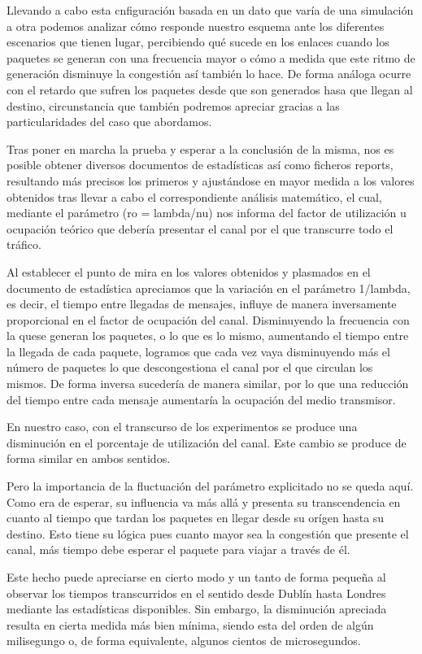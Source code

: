 Llevando a cabo esta cnfiguración basada en un dato que varía de una simulación a otra podemos analizar cómo responde nuestro esquema ante los diferentes escenarios que tienen lugar, percibiendo qué sucede en los enlaces cuando los paquetes se generan con una frecuencia mayor o cómo a medida que este ritmo de generación disminuye la congestión así también lo hace. De forma análoga ocurre con el retardo que sufren los paquetes desde que son generados hasa que llegan al destino, circunstancia que también podremos apreciar gracias a las particularidades del caso que abordamos.

Tras poner en marcha la prueba y esperar a la conclusión de la misma, nos es posible obtener diversos documentos de estadísticas así como ficheros reports, resultando más precisos los primeros y ajustándose en mayor medida a los valores obtenidos tras llevar a cabo el correspondiente análisis matemático, el cual, mediante el parámetro (ro = lambda/nu) nos informa del factor de utilización u ocupación teórico que debería presentar el canal por el que transcurre todo el tráfico.

Al establecer el punto de mira en los valores obtenidos y plasmados en el documento de estadística apreciamos que la variación en el parámetro 1/lambda, es decir, el tiempo entre llegadas de mensajes, influye de manera inversamente proporcional en el factor de ocupación del canal. Disminuyendo la frecuencia con la quese generan los paquetes, o lo que es lo mismo, aumentando el tiempo entre la llegada de cada paquete, logramos que cada vez vaya disminuyendo más el número de paquetes lo que descongestiona el canal por el que circulan los mismos. De forma inversa sucedería de manera similar, por lo que una reducción del tiempo entre cada mensaje aumentaría la ocupación del medio transmisor.

En nuestro caso, con el transcurso de los experimentos se produce una disminución en el porcentaje de utilización del canal. Este cambio se produce de forma similar en ambos sentidos.

Pero la importancia de la fluctuación del parámetro explicitado no se queda aquí. Como era de esperar, su influencia va más allá y presenta su transcendencia en cuanto al tiempo que tardan los paquetes en llegar desde su orígen hasta su destino. Esto tiene su lógica pues cuanto mayor sea la congestión que presente el canal, más tiempo debe esperar el paquete para viajar a través de él.

Este hecho puede apreciarse en cierto modo y un tanto de forma pequeña al observar los tiempos transcurridos en el sentido desde Dublín hasta Londres mediante las estadísticas disponibles. Sin embargo, la disminución apreciada resulta en cierta medida más bien mínima, siendo esta del orden de algún milisegungo o, de forma equivalente, algunos cientos de microsegundos.

